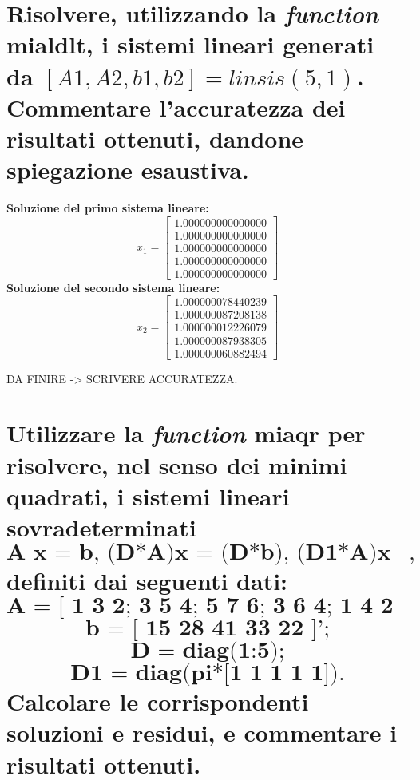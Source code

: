 \documentclass[10pt,a4paper]{article}
\begin{document}
\section{Risolvere, utilizzando la \textit{function} \textbf{mialdlt}, i sistemi
  lineari generati da \textbf{$ [A1,A2,b1,b2]=linsis(5,1)$}.
  \\
  Commentare l'accuratezza
  dei risultati ottenuti, dandone spiegazione esaustiva.}

  \textbf{Soluzione del primo sistema lineare:}
  \[
    x_1 =
    \begin{bmatrix}
      1.000000000000000 \\
      1.000000000000000 \\
      1.000000000000000 \\
      1.000000000000000 \\
      1.000000000000000
    \end{bmatrix}
  \]
  \textbf{Soluzione del secondo sistema lineare:}
  \[
    x_2 =
    \begin{bmatrix}
      1.000000078440239 \\
      1.000000087208138 \\
      1.000000012226079 \\
      1.000000087938305 \\
      1.000000060882494
    \end{bmatrix}
  \]

DA FINIRE -> SCRIVERE ACCURATEZZA.

\section{Utilizzare la \textit{function} \textbf{miaqr} per risolvere, nel senso dei
  minimi quadrati, i sistemi lineari sovradeterminati
  $$ \textbf{A x = b, (D*A)x = (D*b), (D1*A)x = (D1*b)}, $$
  definiti dai seguenti dati:
  $$ \textbf{A = [ 1 3 2; 3 5 4; 5 7 6; 3 6 4; 1 4 2 ];} $$
  $$ \textbf{b = [ 15 28 41 33 22 ]';} $$
  $$ \textbf{D = diag(1:5);} $$
  $$ \textbf{D1 = diag(pi*[1 1 1 1 1]).} $$
  Calcolare le corrispondenti soluzioni e residui, e commentare i risultati ottenuti.}
\end{document}
